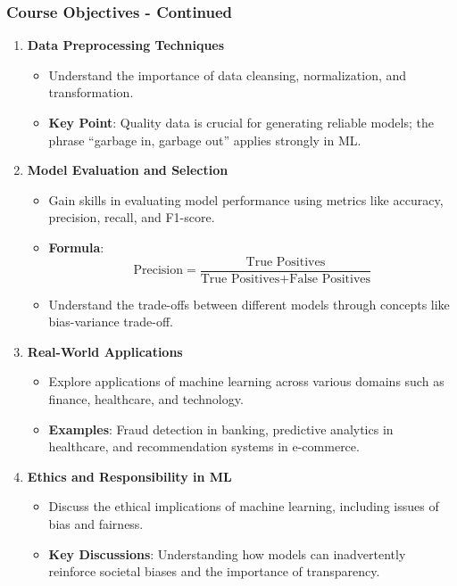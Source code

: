 \documentclass[aspectratio=169]{beamer}
\begin{document}
\begin{frame}[fragile]
    \frametitle{Course Objectives - Continued}
    \begin{enumerate}[resume]
        \item \textbf{Data Preprocessing Techniques}
        \begin{itemize}
            \item Understand the importance of data cleansing, normalization, and transformation.
            \item \textbf{Key Point}: Quality data is crucial for generating reliable models; the phrase ``garbage in, garbage out'' applies strongly in ML.
        \end{itemize}

        \item \textbf{Model Evaluation and Selection}
        \begin{itemize}
            \item Gain skills in evaluating model performance using metrics like accuracy, precision, recall, and F1-score.
            \item \textbf{Formula}:
            \[
            \text{Precision} = \frac{\text{True Positives}}{\text{True Positives} + \text{False Positives}}
            \]
            \item Understand the trade-offs between different models through concepts like bias-variance trade-off.
        \end{itemize}

        \item \textbf{Real-World Applications}
        \begin{itemize}
            \item Explore applications of machine learning across various domains such as finance, healthcare, and technology.
            \item \textbf{Examples}: Fraud detection in banking, predictive analytics in healthcare, and recommendation systems in e-commerce.
        \end{itemize}

        \item \textbf{Ethics and Responsibility in ML}
        \begin{itemize}
            \item Discuss the ethical implications of machine learning, including issues of bias and fairness.
            \item \textbf{Key Discussions}: Understanding how models can inadvertently reinforce societal biases and the importance of transparency.
        \end{itemize}
    \end{enumerate}
\end{frame}
\end{document}
